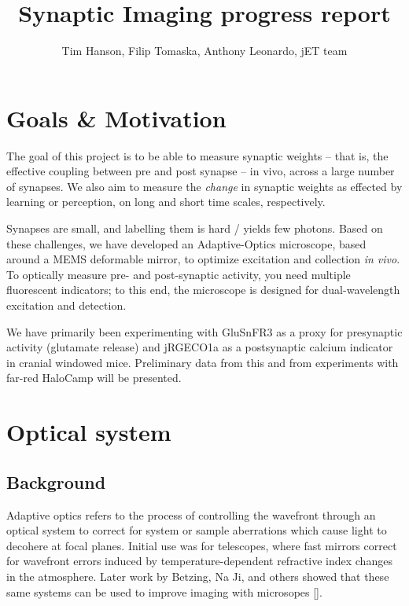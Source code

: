\documentclass[a4paper,12pt]{article}
\title{Synaptic Imaging progress report}
\author{Tim Hanson, Filip Tomaska, Anthony Leonardo, jET team}
\begin{document}
\maketitle

\begin{abstract}

\end{abstract}

\section{Goals \& Motivation}

The goal of this project is to be able to measure synaptic weights -- that is, the effective coupling between pre and post synapse -- in vivo, across a large number of synapses.  We also aim to measure the \textit{change} in synaptic weights as effected by learning or perception, on long and short time scales, respectively.  

Synapses are small, and labelling them is hard / yields few photons.  Based on these challenges, we have developed an Adaptive-Optics microscope, based around a MEMS deformable mirror, to optimize excitation and collection \textit{in vivo}.  To optically measure pre- and post-synaptic activity, you need multiple fluorescent indicators; to this end, the microscope is designed for dual-wavelength excitation and detection.  

We have primarily been experimenting with GluSnFR3 as a proxy for presynaptic activity (glutamate release) and jRGECO1a as a postsynaptic calcium indicator in cranial windowed mice.  Preliminary data from this and from experiments with far-red HaloCamp will be presented.  

\section{Optical system}

\subsection{Background}

Adaptive optics refers to the process of controlling the wavefront through an optical system to correct for system or sample aberrations which cause light to decohere at focal planes.  Initial use was for telescopes, where fast mirrors correct for wavefront errors induced by temperature-dependent refractive index changes in the atmosphere.  Later work by Betzing, Na Ji, and others showed that these same systems can be used to improve imaging with microsopes [].  
\end{document}

